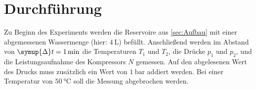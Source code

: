 \section{Durchführung} \label{sec:Durchführung}
    Zu Beginn des Experiments werden die Reservoire aus \autoref{sec:Aufbau} mit einer abgemessenen Wassermenge (hier: $\SI{4}{\liter}$) befüllt.
    Anschließend werden im Abstand von $\symup{\Delta} t = \SI{1}{\minute}$ die Temperaturen $T_1$ und $T_2$, die Drücke $p_1$ und $p_2$, und die Leistungsaufnahme des Kompressors $N$ gemessen.
    Auf den abgelesenen Wert des Drucks muss zusätzlich ein Wert von $\SI{1}{\bar}$ addiert werden.
    Bei einer Temperatur von $\SI{50}{\celsius}$ soll die Messung abgebrochen werden.
